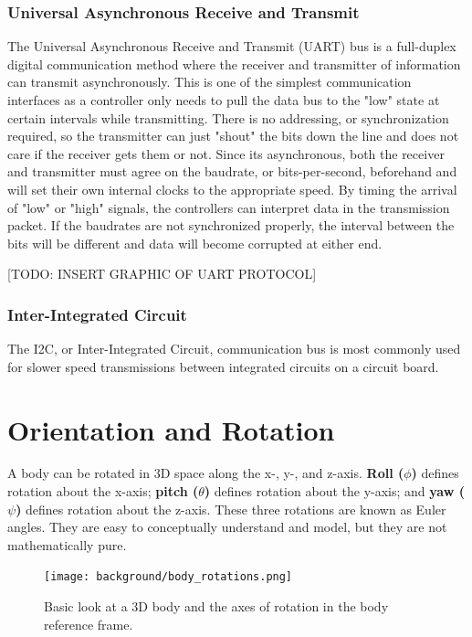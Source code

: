 \subsubsection{Universal Asynchronous Receive and Transmit}
The Universal Asynchronous Receive and Transmit (UART) bus is a full-duplex digital communication method where the receiver and transmitter of information can transmit asynchronously. 
This is one of the simplest communication interfaces as a controller only needs to pull the data bus to the "low" state at certain intervals while transmitting.
There is no addressing, or synchronization required, so the transmitter can just "shout" the bits down the line and does not care if the receiver gets them or not.
Since its asynchronous, both the receiver and transmitter must agree on the baudrate, or bits-per-second, beforehand and will set their own internal clocks to the appropriate speed.
By timing the arrival of "low" or "high" signals, the controllers can interpret data in the transmission packet.
If the baudrates are not synchronized properly, the interval between the bits will be different and data will become corrupted at either end.

[TODO: INSERT GRAPHIC OF UART PROTOCOL]

\subsubsection{Inter-Integrated Circuit}
The I2C, or Inter-Integrated Circuit, communication bus is most commonly used for slower speed transmissions between integrated circuits on a circuit board.

\section{Orientation and Rotation} \label{sec:bkg_orientation}
A body can be rotated in 3D space along the x-, y-, and z-axis.
\textbf{Roll ($\phi$)} defines rotation about the x-axis; \textbf{pitch ($\theta$)} defines rotation about the y-axis; and \textbf{yaw ($\psi$)} defines rotation about the z-axis.
These three rotations are known as Euler angles.
They are easy to conceptually understand and model, but they are not mathematically pure.

\begin{figure}[h!]
    \caption[Body rotations]{Basic look at a 3D body and the axes of rotation in the body reference frame.}
    \label{fig:body_rotations}
    \centering
    \texttt{[image: background/body\_rotations.png]}
\end{figure}

